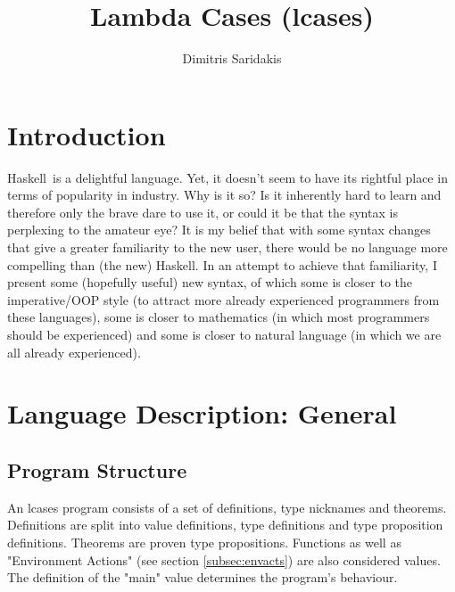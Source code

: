 \documentclass{article}
\date{}
\author{
  Dimitris Saridakis
}
\def\H{Haskell}
\begin{document}
\title{
\textbf{Lambda Cases (lcases)}
}
\maketitle

\tableofcontents

\newpage
\section{Introduction}

\H\ is a delightful language. Yet, it doesn't seem to have its rightful place
in terms of popularity in industry. Why is it so?  Is it inherently hard to
learn and therefore only the brave dare to use it, or could it be that the
syntax is perplexing to the amateur eye? It is my belief that with some syntax
changes that give a greater familiarity to the new user, there would be no
language more compelling than (the new) \H. In an attempt to achieve that
familiarity, I present some (hopefully useful) new syntax, of which some is
closer to the imperative/OOP style (to attract more already experienced
programmers from these languages), some is closer to mathematics (in which most
programmers should be experienced) and some is closer to natural language (in
which we are all already experienced). 

\section{Language Description: General}

\subsection{Program Structure}

An lcases program consists of a set of definitions, type nicknames and
theorems.  Definitions are split into value definitions, type definitions and
type proposition definitions. Theorems are proven type propositions. Functions
as well as "Environment Actions" (see section \ref{subsec:envacts}) are also
considered values. The definition of the "main" value determines the program's
behaviour. 
\end{document}
